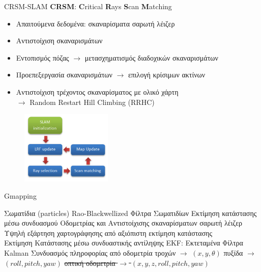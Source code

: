 \documentclass[10pt, compress, handout]{beamer} %
\begin{document}
\begin{frame}{CRSM-SLAM}
	\textbf{CRSM}: \textbf{C}ritical \textbf{R}ays \textbf{S}can \textbf{M}atching
	
	\begin{itemize}
		\item Απαιτούμενα δεδομένα: σκαναρίσματα σαρωτή λέιζερ
		\item Αντιστοίχιση σκαναρισμάτων
		\item Εντοπισμός πόζας $\rightarrow$ μετασχηματισμός διαδοχικών σκαναρισμάτων
		\item Προεπεξεργασία σκαναρισμάτων $\rightarrow$ επιλογή κρίσιμων ακτίνων
		\item Αντιστοίχιση τρέχοντος σκαναρίσματος με ολικό χάρτη\\
		$\rightarrow$ Random Restart Hill Climbing (RRHC)
	\end{itemize}
	\begin{figure}
		\includegraphics[height=3.5cm]{Figures/crsm_slam_diagram.png}
	\end{figure}
\end{frame}

\begin{frame}{Gmapping}
	\begin{outline}
		\1 Σωματίδια (particles)
		\1 Rao-Blackwellized Φίλτρα Σωματιδίων
		\1 Εκτίμηση κατάστασης μέσω συνδυασμού
			\2 Οδομετρίας και
			\2 Αντιστοίχισης σκαναρίσματων σαρωτή λέιζερ
		\1 Υψηλή εξάρτηση χαρτογράφησης από αξιόπιστη εκτίμηση κατάστασης\\[0.5cm]
		
		\1 Εκτίμηση Κατάστασης μέσω συνδυαστικής αντίληψης
		\1 EKF: Εκτεταμένα Φίλτρα Kalman
		\1 Συνδυασμός πληροφορίας από 
			\2 οδομετρία τροχών $\rightarrow$ $(x,y,\theta)$
			\2 πυξίδα $\rightarrow$ $(roll,pitch,yaw)$
			\2 \sout{οπτική οδομετρία $\rightarrow$ $(x,y,z,roll,pitch,yaw)$}
	\end{outline}
\end{frame}
\end{document}
